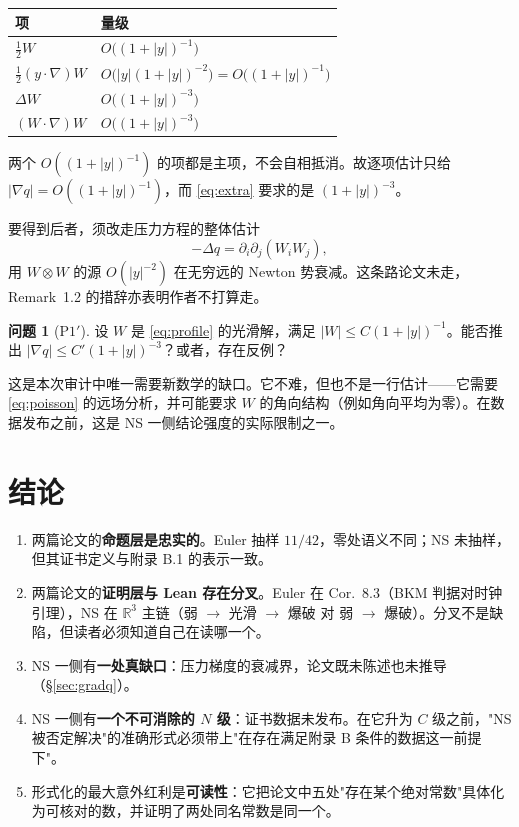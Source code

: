 \documentclass[11pt,a4paper]{ctexart}
\theoremstyle{definition}
\newtheorem{question}[theorem]{问题}
\newcommand{\R}{\mathbb{R}}
\newcommand{\abs}[1]{\left\lvert #1\right\rvert}
\begin{document}
\begin{center}
\begin{tabular}{@{}ll@{}}
\toprule
项 & 量级 \\
\midrule
$\tfrac12W$ & $O\bigl((1+\abs{y})^{-1}\bigr)$ \\
$\tfrac12(y\cdot\nabla)W$ & $O\bigl(\abs{y}(1+\abs{y})^{-2}\bigr)=O\bigl((1+\abs{y})^{-1}\bigr)$ \\
$\Delta W$ & $O\bigl((1+\abs{y})^{-3}\bigr)$ \\
$(W\cdot\nabla)W$ & $O\bigl((1+\abs{y})^{-3}\bigr)$ \\
\bottomrule
\end{tabular}
\end{center}

两个 $O((1+\abs{y})^{-1})$ 的项都是主项，不会自相抵消。故逐项估计只给 $\abs{\nabla q}=O((1+\abs{y})^{-1})$，而 \eqref{eq:extra} 要求的是 $(1+\abs{y})^{-3}$。

要得到后者，须改走压力方程的整体估计
\begin{equation}\label{eq:poisson}
-\Delta q=\partial_i\partial_j(W_iW_j),
\end{equation}
用 $W\otimes W$ 的源 $O(\abs{y}^{-2})$ 在无穷远的 Newton 势衰减。这条路论文未走，Remark~1.2 的措辞亦表明作者不打算走。

\begin{question}[$\mathrm{P1}'$]
设 $W$ 是 \eqref{eq:profile} 的光滑解，满足 $\abs{W}\le C(1+\abs{y})^{-1}$。能否推出 $\abs{\nabla q}\le C'(1+\abs{y})^{-3}$？或者，存在反例？
\end{question}

这是本次审计中唯一需要新数学的缺口。它不难，但也不是一行估计——它需要 \eqref{eq:poisson} 的远场分析，并可能要求 $W$ 的角向结构（例如角向平均为零）。在数据发布之前，这是 NS 一侧结论强度的实际限制之一。

\section{结论}

\begin{enumerate}[label=(\arabic*)]
\item 两篇论文的\textbf{命题层是忠实的}。Euler 抽样 $11/42$，零处语义不同；NS 未抽样，但其证书定义与附录 B.1 的表示一致。
\item 两篇论文的\textbf{证明层与 Lean 存在分叉}。Euler 在 Cor.~8.3（BKM 判据对时钟引理），NS 在 $\R^3$ 主链（弱 $\to$ 光滑 $\to$ 爆破 对 弱 $\to$ 爆破）。分叉不是缺陷，但读者必须知道自己在读哪一个。
\item NS 一侧有\textbf{一处真缺口}：压力梯度的衰减界，论文既未陈述也未推导（\S\ref{sec:gradq}）。
\item NS 一侧有\textbf{一个不可消除的 $N$ 级}：证书数据未发布。在它升为 $C$ 级之前，"NS 被否定解决"的准确形式必须带上"在存在满足附录 B 条件的数据这一前提下"。
\item 形式化的最大意外红利是\textbf{可读性}：它把论文中五处"存在某个绝对常数"具体化为可核对的数，并证明了两处同名常数是同一个。
\end{enumerate}
\end{document}
